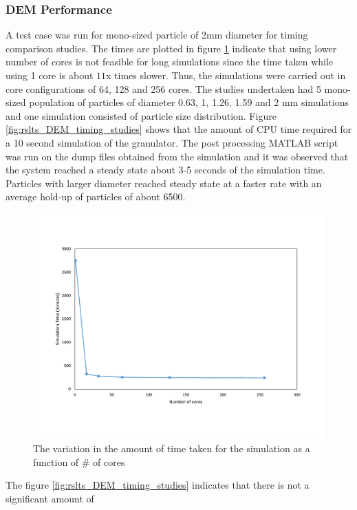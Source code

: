 \documentclass[preprint,11pt,authoryear]{elsarticle}
\begin{document}
\subsubsection{DEM Performance}
\par A test case was run for mono-sized particle of 2mm diameter for timing comparison studies. The 
times are plotted in figure \ref{fig:rslts_DEM_2mm_timing} indicate that using lower number of cores is 
not feasible for long simulations since the time taken while using 1 core is about $11$x times slower.
Thus, the simulations were carried out in core configurations of 64, 128 and 256 cores. The studies 
undertaken had 5 mono-sized population of particles of diameter 0.63, 1, 1.26, 1.59 and 2 mm 
simulations and one simulation consisted of particle size distribution. Figure 
\ref{fig:rslts_DEM_timing_studies} shows that the amount of CPU time required for a 10 second 
simulation of the granulator. The post processing MATLAB script was run on the dump files obtained 
from the simulation and it was observed that the system reached a steady state about 3-5 seconds of 
the simulation time. Particles with larger diameter reached steady state at a faster rate with an average 
hold-up of particles of about 6500. 
\begin{figure}[H]
\centering
\includegraphics[scale=0.5]{rslts_DEM_2mm_timing.pdf}
\caption{The variation in the amount of time taken for the simulation as a function of \# of cores}
\label{fig:rslts_DEM_2mm_timing}
\end{figure}	    
\par The figure \ref{fig:rslts_DEM_timing_studies} indicates that there is not a significant amount of 
\end{document}
